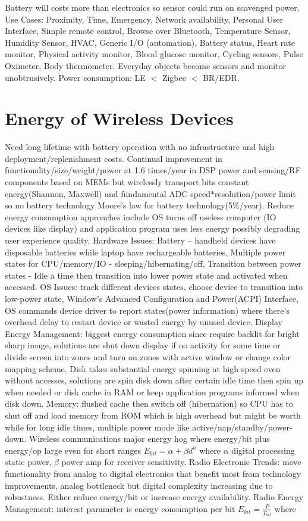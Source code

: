 \documentclass[9pt]{extarticle}
\begin{document}
\begin{multicols}{2}
Battery will costs more than electronics so sensor could run on scavenged power. Use Cases: Proximity, Time, Emergency, Network availability, Personal User Interface, Simple remote control, Browse over Bluetooth, Temperature Sensor, Humidity Sensor, HVAC, Generic I/O (automation), Battery status, Heart rate monitor, Physical activity monitor, Blood glucose monitor, Cycling sensors, Pulse Oximeter, Body thermometer. Everyday objects become sensors and monitor unobtrusively. Power consumption: LE $<$ Zigbee $<$ BR/EDR.

\section{Energy of Wireless Devices}

Need long lifetime with battery operation with no infrastructure and high deployment/replenishment costs. Continual improvement in functionality/size/weight/power at 1.6 times/year in DSP power and sensing/RF components based on MEMs but wirelessly transport bits constant energy(Shannon, Maxwell) and fundamental ADC speed$*$resolution$/$power limit so no battery technology Moore’s law for battery technology(5$\%$/year). Reduce energy consumption approaches include OS turns off useless computer (IO devices like display) and application program uses less energy possibly degrading user experience quality. Hardware Issues: Battery – handheld devices have disposable batteries while laptop have rechargeable batteries, Multiple power states for CPU/memory/IO - sleeping/hibernating/off, Transition between power states - Idle a time then transition into lower power state and activated when accessed. OS Issues: track different devices states, choose device to transition into low-power state, Window's Advanced Configuration and Power(ACPI) Interface, OS commands device driver to report states(power information) where there's overhead delay to restart device or wasted energy by unused device. Display Energy Management: biggest energy consumption since require backlit for bright sharp image, solutions are shut down display if no activity for some time or divide screen into zones and turn on zones with active window or change color mapping scheme. Disk takes substantial energy spinning at high speed even without accesses,  solutions are spin disk down after certain idle time then spin up when needed or disk cache in RAM or keep application programs informed when disk down. Memory: flushed cache then switch off (hibernation) so CPU has to shut off and load memory from ROM which is high overhead but might be worth while for long idle times, multiple power mode like active/nap/standby/power-down. Wireless communications major energy hog where energy/bit plus energy/op large even for short ranges $E_{bit}=\alpha+\beta{d^n}$ where $\alpha$ digital processing static power, $\beta$ power amp for receiver sensitivity. Radio Electronic Trends: move functionality from analog to digital electronics that benefit most from technology improvements, analog bottleneck but digital complexity increasing due to robustness. Either reduce energy/bit or increase energy availability. Radio Energy Management: interest parameter is energy consumption per bit $E_{bit}=\frac{P}{T_{bit}}$ where 
\end{multicols}
\end{document}
